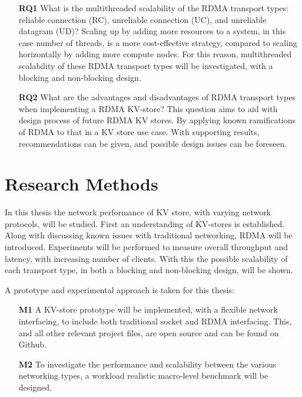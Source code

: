 \begin{itemize}
    \item[\textbf{RQ1}] What is the multithreaded scalability of the RDMA transport types: reliable connection (RC), unreliable connection (UC), and unreliable datagram (UD)?
    Scaling up by adding more resources to a system, in this case number of threads, is a more cost-effective strategy, compared to scaling horizontally by adding more compute nodes.
    For this reason, multithreaded scalability of these RDMA transport types will be investigated, with a blocking and non-blocking design.
    \item[\textbf{RQ2}] What are the advantages and disadvantages of RDMA transport types when implementing a RDMA KV-store?
    This question aims to aid with design process of future RDMA KV stores.
    By applying known ramifications of RDMA to that in a KV store use case.
    With supporting results, recommendations can be given, and possible design issues can be foreseen.
\end{itemize}

\section{Research Methods}
In this thesis the network performance of KV store, with varying network protocols, will be studied.
First an understanding of KV-stores is established.
Along with discussing known issues with traditional networking, RDMA will be introduced.
Experiments will be performed to measure overall throughput and latency, with increasing number of clients.
With this the possible scalability of each transport type, in both a blocking and non-blocking design, will be shown.

A prototype\cite{iosup2019atlarge,hamming1998art,peffers2007design} and experimental\cite{jain1990art,heiser2010,ousterhout2018always} approach is taken for this thesis:
\begin{itemize}
    \item[\textbf{M1}] A KV-store prototype will be implemented, with a flexible network interfacing, to include both traditional socket and RDMA interfacing.
    This, and all other relevant project files, are open source and can be found on Github\cite{github}.
    \item[\textbf{M2}] To investigate the performance and scalability between the various networking types, a workload realistic\cite{atikoglu2012workload} macro-level benchmark will be designed.
\end{itemize}

